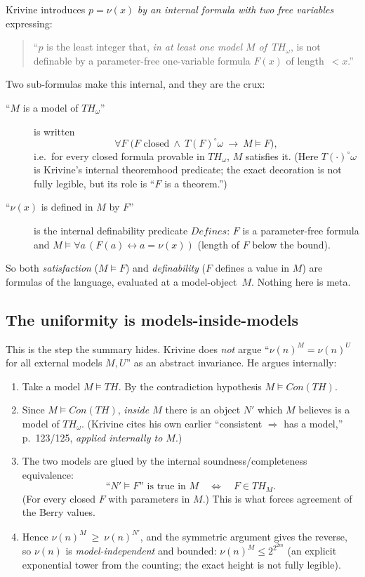 \documentclass[11pt]{article}
\theoremstyle{plain}
\theoremstyle{definition}
\theoremstyle{remark}
\newcommand{\Con}{\mathit{Con}}
\newcommand{\Defines}{\mathit{Defines}}
\newcommand{\Thy}{\mathit{TH}}
\newcommand{\Thyo}{\mathit{TH}_\omega}
\newcommand{\sat}{\models}
\begin{document}
Krivine introduces $p=\nu(x)$ \emph{by an internal formula with two
free variables} expressing:
\begin{quote}
``$p$ is the least integer that, \emph{in at least one model $M$
of~$\Thyo$}, is not definable by a parameter-free one-variable formula
$F(x)$ of length~$<x$.''
\end{quote}
Two sub-formulas make this internal, and they are the crux:
\begin{description}
\item[``$M$ is a model of $\Thyo$''] is written
  \[
     \forall F\;\bigl(F\text{ closed}\ \wedge\ T(F)^{\circ}\omega
        \ \rightarrow\ M\sat F\bigr),
  \]
  i.e.\ for every closed formula provable in $\Thyo$, $M$ satisfies it.
  (Here $T(\cdot)^{\circ}\omega$ is Krivine's internal theoremhood
  predicate; the exact decoration is not fully legible, but its role is
  ``$F$ is a theorem.'')
\item[``$\nu(x)$ is defined in $M$ by $F$''] is the internal
  definability predicate $\Defines$: $F$ is a parameter-free formula and
  $M\sat \forall a\,(F(a)\leftrightarrow a=\nu(x))$ (length of $F$ below
  the bound).
\end{description}
So both \emph{satisfaction} ($M\sat F$) and \emph{definability}
($F$ defines a value in $M$) are formulas of the language, evaluated at a
model-object~$M$.  Nothing here is meta.

\subsection{The uniformity is models-inside-models}

This is the step the summary hides.  Krivine does \emph{not} argue
``$\nu(n)^M=\nu(n)^U$ for all external models $M,U$'' as an abstract
invariance.  He argues internally:

\begin{enumerate}
\item Take a model $M\sat\Thy$.  By the contradiction hypothesis
  $M\sat\Con(\Thy)$.
\item Since $M\sat\Con(\Thy)$, \emph{inside $M$} there is an object $N'$
  which $M$ believes is a model of $\Thyo$.  (Krivine cites his own
  earlier ``consistent $\Rightarrow$ has a model,'' p.~123/125,
  \emph{applied internally to $M$}.)
\item The two models are glued by the internal soundness/completeness
  equivalence:
  \[
     \text{``}N'\sat F\text{'' is true in } M
        \quad\Longleftrightarrow\quad F\in\Thy_M .
  \]
  (For every closed $F$ with parameters in $M$.)  This is what forces
  agreement of the Berry values.
\item Hence $\nu(n)^{M}\ \ge\ \nu(n)^{N'}$, and the symmetric argument
  gives the reverse, so $\nu(n)$ is \emph{model-independent} and bounded:
  $\nu(n)^{M}\le 2^{2^{2m}}$ (an explicit exponential tower from the
  counting; the exact height is not fully legible).
\end{enumerate}
\end{document}
